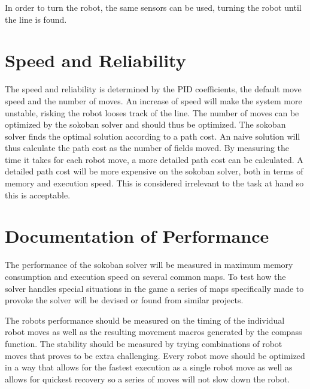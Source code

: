 \documentclass[a4paper,10pt]{article}
\begin{document}
In order to turn the robot, the same sensors can be used, turning the robot until the line is found.

\section{Speed and Reliability}
The speed and reliability is determined by the PID coefficients, the default move speed and the number of moves.
An increase of speed will make the system more unstable, risking the robot looses track of the line.
The number of moves can be optimized by the sokoban solver and should thus be optimized.
The sokoban solver finds the optimal solution according to a path cost.
An naive solution will thus calculate the path cost as the number of fields moved.
By measuring the time it takes for each robot move, a more detailed path cost can be calculated.
A detailed path cost will be more expensive on the sokoban solver, both in terms of memory and execution speed.
This is considered irrelevant to the task at hand so this is acceptable.

\section{Documentation of Performance}
The performance of the sokoban solver will be measured in maximum memory consumption and execution speed on several common maps.
To test how the solver handles special situations in the game a series of maps specifically made to provoke the solver will be devised or found from similar projects.

The robots performance should be measured on the timing of the individual robot moves as well as the resulting movement macros generated by the compass function.
The stability should be measured by trying combinations of robot moves that proves to be extra challenging.
Every robot move should be optimized in a way that allows for the fastest execution as a single robot move as well as allows for quickest recovery so a series of moves will not slow down the robot.
\end{document}
